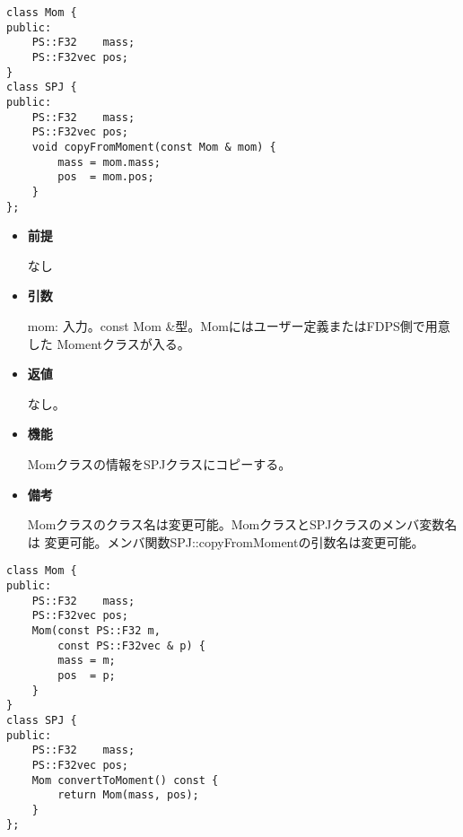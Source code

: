 
\begin{screen}
\begin{verbatim}
class Mom {
public:
    PS::F32    mass;
    PS::F32vec pos;
}
class SPJ {
public:
    PS::F32    mass;
    PS::F32vec pos;
    void copyFromMoment(const Mom & mom) {
        mass = mom.mass;
        pos  = mom.pos;
    }
};
\end{verbatim}
\end{screen}

\begin{itemize}

\item {\bf 前提}

  なし
  
\item {\bf 引数}

  mom: 入力。const Mom \&型。Momにはユーザー定義またはFDPS側で用意した
  Momentクラスが入る。

\item {\bf 返値}

  なし。
  
\item {\bf 機能}

  Momクラスの情報をSPJクラスにコピーする。

\item {\bf 備考}

  Momクラスのクラス名は変更可能。MomクラスとSPJクラスのメンバ変数名は
  変更可能。メンバ関数SPJ::copyFromMomentの引数名は変更可能。

\end{itemize}


\begin{screen}
\begin{verbatim}
class Mom {
public:
    PS::F32    mass;
    PS::F32vec pos;
    Mom(const PS::F32 m,
        const PS::F32vec & p) {
        mass = m;
        pos  = p;
    }
}
class SPJ {
public:
    PS::F32    mass;
    PS::F32vec pos;
    Mom convertToMoment() const {
        return Mom(mass, pos);
    }
};
\end{verbatim}
\end{screen}

